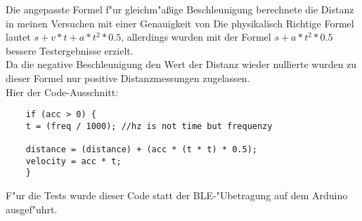 Die angepasste Formel f"ur gleichm"aßige Beschleunigung berechnete
die Distanz in meinen Versuchen mit einer Genauigkeit von
Die physikalisch Richtige Formel lautet 
$s + v * t  + a * t^2 * 0.5$,
allerdings wurden mit der Formel $s + a * t^2 * 0.5$ 
bessere Testergebnisse erzielt.\\
Da die negative Beschleunigung den Wert der Distanz wieder nullierte
wurden zu dieser Formel nur positive Distanzmessungen zugelassen.\\
Hier der Code-Ausschnitt:
\begin{verbatim}
    if (acc > 0) {
    t = (freq / 1000); //hz is not time but frequenzy

    distance = (distance) + (acc * (t * t) * 0.5);
    velocity = acc * t;
    }
\end{verbatim}
F"ur die Tests wurde dieser Code statt der BLE-"Ubetragung auf dem Arduino ausgef"uhrt.